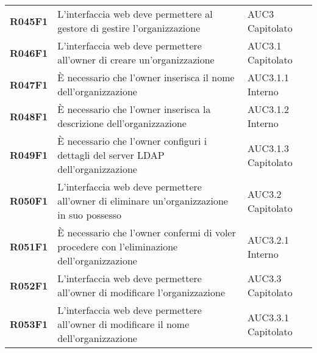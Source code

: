 \documentclass[../analisi-dei-requisiti.tex]{subfiles}
\begin{document}
\begin{longtable}[H]{>{\centering\bfseries}m{3cm} >{\centering}m{10cm} >{\centering\arraybackslash}m{3cm}}
  R045F1                               & L'interfaccia web deve permettere al gestore di gestire l'organizzazione                                                                                                                                & AUC3 Capitolato               \\
  R046F1                               & L'interfaccia web deve permettere all'owner di creare un'organizzazione                                                                                                                                 & AUC3.1 Capitolato             \\
  R047F1                               & È necessario che l'owner inserisca il nome dell'organizzazione                                                                                                                                          & AUC3.1.1 Interno              \\
  R048F1                               & È necessario che l'owner inserisca la descrizione dell'organizzazione                                                                                                                                   & AUC3.1.2 Interno              \\
  R049F1                               & È necessario che l'owner configuri i dettagli del server LDAP dell'organizzazione                                                                                                                       & AUC3.1.3 Capitolato           \\
  R050F1                               & L'interfaccia web deve permettere all'owner di eliminare un'organizzazione in suo possesso                                                                                                              & AUC3.2 Capitolato             \\
  R051F1                               & È necessario che l'owner confermi di voler procedere con l'eliminazione dell'organizzazione                                                                                                             & AUC3.2.1 Interno              \\
  R052F1                               & L'interfaccia web deve permettere all'owner di modificare l'organizzazione                                                                                                                              & AUC3.3 Capitolato             \\
  R053F1                               & L'interfaccia web deve permettere all'owner di modificare il nome dell'organizzazione                                                                                                                   & AUC3.3.1 Capitolato           \\

\end{longtable}
\end{document}
